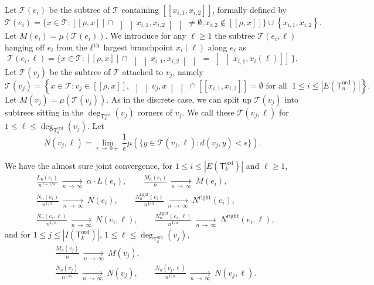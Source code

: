 \documentclass[AHL,Unicode,longabstracts,published]{cedram}
\newcommand{\abs}[1]{\left\lvert#1\right\rvert}
\newcommand{\seg}[2]{\left[\! \left[#1, #2 \right] \! \right]}
\newcommand{\oseg}[2]{\, \left] \! \left] #1, #2 \right[\! \right[\,}
\newcommand{\hoseg}[2]{\, \left] \! \left] #1, #2 \right] \! \right] \,}
\newcommand{\ord}{\mathrm{ord}}
\newcommand{\Rightll}{\mathrm{right}}
\newcommand{\cT}{\mathcal{T}}
\newcommand{\sT}{\mathsf{T}}
\begin{document}
Let $\cT(e_i)$ be the subtree of $\cT$ containing $\seg{x_{i,1}}{x_{i,2}}$, formally defined by
\[
\cT(e_i) = \big\{x \in \cT: \seg{\rho}{x} \cap \oseg{x_{i,1}}{x_{i,2}} \neq \emptyset, x_{i,2} \notin \seg{\rho}{x}\big\} \cup \left\{x_{i,1},x_{i,2}\right\}.
\]
Let $M(e_i) = \mu(\cT(e_i))$. We introduce for any $\ell\geq 1$ the subtree $\cT(e_i,\ell)$ hanging off $e_i$ from the $\ell^{\rm th}$ largest branchpoint $x_i(\ell)$ along $e_i$ as
\[
\cT(e_i,\ell) = \big\{x \in \cT: \seg{\rho}{x} \cap \oseg{x_{i,1}}{x_{i,2}} = \hoseg{x_{i,1}}{x_{i}(\ell)}\big\}.
\]
Let $\cT(v_j)$ be the subtree of $\cT$ attached to $v_j$, namely
\[
\cT(v_j) = \left\{x \in \cT: v_j \in \seg{\rho}{x}, \oseg{v_j}{x} \cap \seg{x_{i,1}}{x_{i,2}} = \emptyset \text{ for all }\; 1 \le i \le \abs{E\left(\sT_n^{\ord}\right)}\right\}.
\]
Let $M(v_j) = \mu(\cT(v_j))$. As in the discrete case, we can split up $\cT(v_j)$ into subtrees sitting in the $\deg_{\sT_k^{\ord}}(v_j)$ corners of $v_j$. We call these $\cT(v_j, \ell)$ for $1 \le \ell \le \deg_{\sT_k^{\ord}}(v_j)$. Let
\[
N\left(v_j, \ell\right) = \lim_{\epsilon\,\to\,0+} \frac{1}{\epsilon} \mu\left(\big\{y \in \cT(v_j, \ell): d(v_j,y) < \epsilon\big\}\right).
\]

\begin{lemm}\label{lem:grandeurslimites}
We have the almost sure joint convergence, for $1 \leq i\leq |E(\sT_k^{\ord})|$ and $\ell \ge 1$,
\begin{align*}
& \frac{L_{n}(e_i)}{n^{1-1/\alpha}} \ \underset{n\, \rightarrow\,\infty} \longrightarrow \ \alpha \cdot L(e_i),
\qquad\frac{M_n(e_i)}{n} \ \underset{n\,\rightarrow \,\infty} \longrightarrow \ M(e_i), \\
& \frac{N_{n}(e_i)}{n^{1/\alpha}} \ \underset{n \,\rightarrow\,\infty} \longrightarrow \ N(e_i), \qquad \frac{N^{\Rightll}_{n}(e_i)}{n^{1/\alpha}} \ \underset{n\,\rightarrow\,\infty} \longrightarrow \ N^{\Rightll}(e_i), \\
& \frac{N_{n}(e_i,\ell)}{n^{1/\alpha}} \ \underset{n \,\rightarrow\,\infty} \longrightarrow \ N(e_i,\ell), \qquad \frac{N^{\Rightll}_{n}(e_i, \ell)}{n^{1/\alpha}} \ \underset{n\,\rightarrow\,\infty} \longrightarrow \ N^{\Rightll}(e_i,\ell),
\end{align*}
and for $1 \leq j \leq |I(\sT_k^{\ord})|$, $1 \leq \ell \leq \deg_{\sT_k^{\ord}}(v_j)$,
\begin{align*}
& \frac{M_{n}(v_j)}{n} \ \underset{n\,\rightarrow \,\infty} \longrightarrow \ M(v_j), \\
& \frac{N_n(v_j)}{n^{1/\alpha}} \ \underset{n \,\rightarrow\,\infty} \longrightarrow \ {N(v_j)}, \qquad \frac{N_n(v_j, \ell)}{n^{1/\alpha}} \ \underset{n\,\rightarrow\,\infty} \longrightarrow \ {N(v_j, \ell)}.
\end{align*}
\end{lemm}
\end{document}
